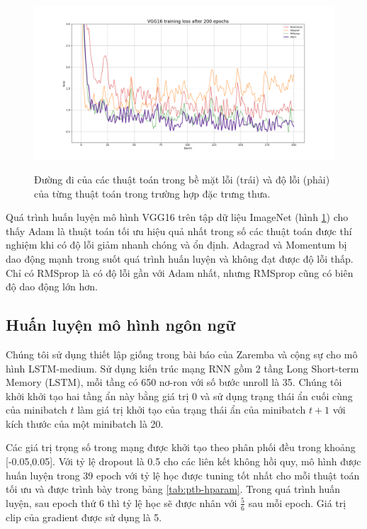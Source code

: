 \begin{figure}[htp]
	\centering
	\includegraphics[width=140 mm]{images/vgg16.png}
	\label{fig:vgg16-loss}
	\caption{Đường đi của các thuật toán trong bề mặt lỗi (trái) và độ lỗi (phải) của từng thuật toán trong trường hợp đặc trưng thưa.}
\end{figure}

Quá trình huấn luyện mô hình VGG16 trên tập dữ liệu ImageNet (hình \ref{fig:vgg16-loss}) cho thấy Adam là thuật toán tối ưu hiệu quả nhất trong số các thuật toán được thí nghiệm khi có độ lỗi giảm nhanh chóng và ổn định. Adagrad và Momentum bị dao động mạnh trong suốt quá trình huấn luyện và không đạt được độ lỗi thấp. Chỉ có RMSprop là có độ lỗi gần với Adam nhất, nhưng RMSprop cũng có biên độ dao động lớn hơn.

\subsection{Huấn luyện mô hình ngôn ngữ}

Chúng tôi sử dụng thiết lập giống trong bài báo của Zaremba và cộng sự \cite{zaremba2014recurrent} cho mô hình LSTM-medium. Sử dụng kiến trúc mạng RNN gồm 2 tầng Long Short-term Memory (LSTM), mỗi tầng có 650 nơ-ron với số bước unroll là 35. Chúng tôi khởi khởi tạo hai tầng ẩn này bằng giá trị 0 và sử dụng trạng thái ẩn cuối cùng của minibatch $t$ làm giá trị khởi tạo của trạng thái ẩn của minibatch $t+1$ với kích thước của một minibatch là 20.

Các giá trị trọng số trong mạng được khởi tạo theo phân phối đều trong khoảng [-0.05,0.05]. Với tỷ lệ dropout là 0.5 cho các liên kết không hồi quy, mô hình được huấn luyện trong 39 epoch với tỷ lệ học được tuning tốt nhất cho mỗi thuật toán tối ưu và được trình bày trong bảng \ref{tab:ptb-hparam}. Trong quá trình huấn luyện, sau epoch thứ 6 thì tỷ lệ học sẽ được nhân với $\frac{5}{6}$ sau mỗi epoch. Giá trị clip của gradient được sử dụng là 5.

